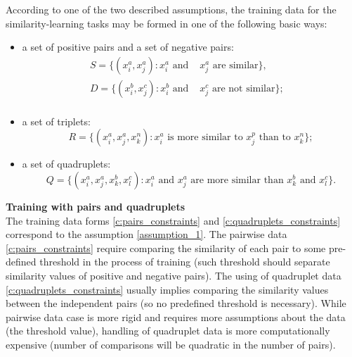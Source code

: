 According to one of the two described assumptions, the training data for the similarity-learning tasks may be formed in one of the following basic ways:

\begin{itemize}
    \item a set of positive pairs and a set of negative pairs:
        \begin{equation}
          \begin{aligned}
          \label{c:pairs_constraints}
                   S = \{(x_i^a, x_j^a): x_i^a \text{ and }& x_j^a \text{ are similar}\}, & \\
                   D = \{(x_i^b, x_j^c): x_i^b \text{ and }& x_j^c \text{ are not similar}\};&\\
          \end{aligned}
        \end{equation}

     
    \item a set of triplets:
     \begin{equation}
     \label{c:triplets_constraints}
          R = \{(x_i^a, x_j^a, x_k^n): x_i^a \text{ is more similar to } x_j^p \text{ than to } x_k^n\}; 
     \end{equation}
     
     \item a set of quadruplets:
     \begin{equation}
         \label{c:quadruplets_constraints}
          Q = \{(x_i^a, x_j^a, x_k^b, x_l^c): x_i^a \text{ and } x_j^a \text{ are more similar than } x_k^b \text{ and } x_l^c\}.
      \end{equation}
\end{itemize}

\bigskip\textbf{Training with pairs and quadruplets}\\
The training data forms \ref{c:pairs_constraints} and \ref{c:quadruplets_constraints} correspond to the assumption \ref{assumption_1}. The pairwise data \ref{c:pairs_constraints} require comparing the similarity of each pair to some pre-defined threshold in the process of training (such threshold should separate similarity values of positive and negative pairs). The using of quadruplet data \ref{c:quadruplets_constraints} usually implies comparing the similarity values between the independent pairs (so no predefined threshold is necessary). While pairwise data case is more rigid and requires more assumptions about the data (the threshold value), handling of quadruplet data  is more computationally expensive (number of comparisons will be quadratic in the number of pairs).

